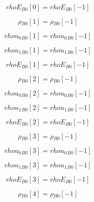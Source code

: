 \documentclass{article}
\begin{document}
\begin{dmath}{rhoE{_{B0}}}[{0}] = {rhoE{_{B0}}}[{-1}]\end{dmath}

\begin{dmath}{\rho{_{B0}}}[{1}] = {\rho{_{B0}}}[{-1}]\end{dmath}

\begin{dmath}{rhou_{0}{_{B0}}}[{1}] = {rhou_{0}{_{B0}}}[{-1}]\end{dmath}

\begin{dmath}{rhou_{1}{_{B0}}}[{1}] = {rhou_{1}{_{B0}}}[{-1}]\end{dmath}

\begin{dmath}{rhoE{_{B0}}}[{1}] = {rhoE{_{B0}}}[{-1}]\end{dmath}

\begin{dmath}{\rho{_{B0}}}[{2}] = {\rho{_{B0}}}[{-1}]\end{dmath}

\begin{dmath}{rhou_{0}{_{B0}}}[{2}] = {rhou_{0}{_{B0}}}[{-1}]\end{dmath}

\begin{dmath}{rhou_{1}{_{B0}}}[{2}] = {rhou_{1}{_{B0}}}[{-1}]\end{dmath}

\begin{dmath}{rhoE{_{B0}}}[{2}] = {rhoE{_{B0}}}[{-1}]\end{dmath}

\begin{dmath}{\rho{_{B0}}}[{3}] = {\rho{_{B0}}}[{-1}]\end{dmath}

\begin{dmath}{rhou_{0}{_{B0}}}[{3}] = {rhou_{0}{_{B0}}}[{-1}]\end{dmath}

\begin{dmath}{rhou_{1}{_{B0}}}[{3}] = {rhou_{1}{_{B0}}}[{-1}]\end{dmath}

\begin{dmath}{rhoE{_{B0}}}[{3}] = {rhoE{_{B0}}}[{-1}]\end{dmath}

\begin{dmath}{\rho{_{B0}}}[{4}] = {\rho{_{B0}}}[{-1}]\end{dmath}
\end{document}
